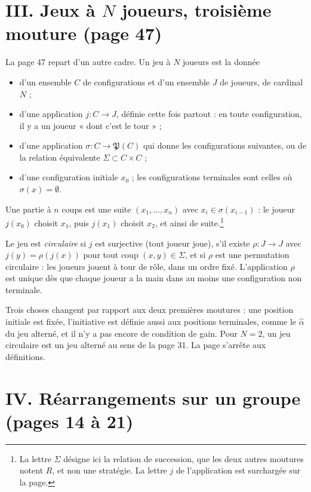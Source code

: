 \documentclass[11pt,a4paper]{article}
\begin{document}
\section*{III. Jeux à $N$ joueurs, troisième mouture (page 47)}

La page 47 repart d'un autre cadre. Un jeu à $N$ joueurs est la donnée
\begin{itemize}
  \item d'un ensemble $C$ de configurations et d'un ensemble $J$ de joueurs,
  de cardinal $N$ ;
  \item d'une application $j : C \to J$, définie cette fois partout : en
  toute configuration, il y a un joueur « dont c'est le tour » ;
  \item d'une application $\sigma : C \to \mathfrak{P}(C)$ qui donne les
  configurations suivantes, ou de la relation équivalente
  $\Sigma \subset C \times C$ ;
  \item d'une configuration initiale $x_0$ ; les configurations terminales
  sont celles où $\sigma(x) = \emptyset$.
\end{itemize}
Une partie à $n$ coups est une suite $(x_1, \ldots, x_n)$ avec
$x_i \in \sigma(x_{i-1})$ : le joueur $j(x_0)$ choisit $x_1$, puis $j(x_1)$
choisit $x_2$, et ainsi de suite.\footnote{La lettre $\Sigma$ désigne ici la
relation de succession, que les deux autres moutures notent $R$, et non une
stratégie. La lettre $j$ de l'application est surchargée sur la page.}

Le jeu est \emph{circulaire} si $j$ est surjective (tout joueur joue), s'il
existe $\rho : J \to J$ avec $j(y) = \rho(j(x))$ pour tout coup
$(x, y) \in \Sigma$, et si $\rho$ est une permutation circulaire : les
joueurs jouent à tour de rôle, dans un ordre fixé. L'application $\rho$ est
unique dès que chaque joueur a la main dans au moins une configuration non
terminale.

Trois choses changent par rapport aux deux premières moutures : une position
initiale est fixée, l'initiative est définie aussi aux positions terminales,
comme le $\hat\alpha$ du jeu alterné, et il n'y a pas encore de condition de
gain. Pour $N = 2$, un jeu circulaire est un jeu alterné au sens de la page
31. La page s'arrête aux définitions.

\section*{IV. Réarrangements sur un groupe (pages 14 à 21)}
\end{document}
